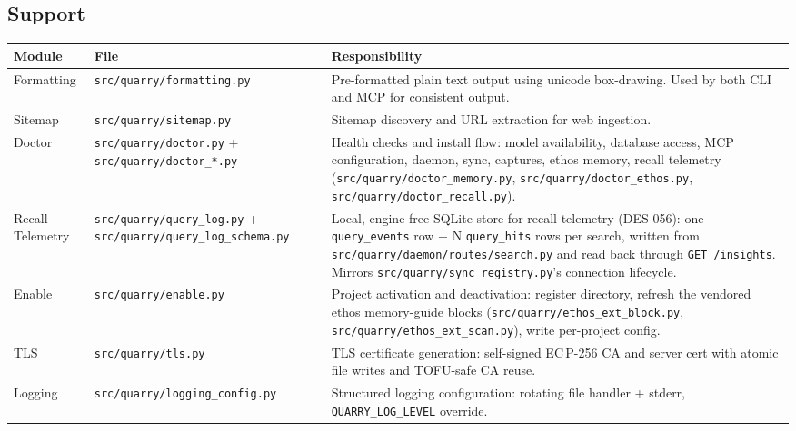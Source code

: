 \documentclass[a4paper,10pt]{article}
\newcommand{\modpath}[1]{\texttt{src/quarry/#1}}
\begin{document}
\subsection{Support}

\begin{center}
\begin{tabular}{llp{7cm}}
\toprule
\textbf{Module} & \textbf{File} & \textbf{Responsibility} \\
\midrule
Formatting & \modpath{formatting.py} & Pre-formatted plain text
             output using unicode box-drawing.  Used by both CLI
             and MCP for consistent output. \\
Sitemap    & \modpath{sitemap.py}    & Sitemap discovery and URL
             extraction for web ingestion. \\
Doctor     & \modpath{doctor.py} + \modpath{doctor\_*.py} & Health checks
             and install flow: model availability, database access, MCP
             configuration, daemon, sync, captures, ethos memory, recall
             telemetry (\modpath{doctor\_memory.py}, \modpath{doctor\_ethos.py},
             \modpath{doctor\_recall.py}). \\
Recall Telemetry & \modpath{query\_log.py} + \modpath{query\_log\_schema.py}
             & Local, engine-free SQLite store for recall telemetry
             (DES-056): one \texttt{query\_events} row + N
             \texttt{query\_hits} rows per search, written from
             \modpath{daemon/routes/search.py} and read back through
             \texttt{GET /insights}. Mirrors \modpath{sync\_registry.py}'s
             connection lifecycle. \\
Enable     & \modpath{enable.py}     & Project activation and
             deactivation: register directory, refresh the vendored
             ethos memory-guide blocks (\modpath{ethos\_ext\_block.py},
             \modpath{ethos\_ext\_scan.py}), write per-project config. \\
TLS        & \modpath{tls.py}        & TLS certificate generation:
             self-signed EC\,P-256 CA and server cert with
             atomic file writes and TOFU-safe CA reuse. \\
Logging    & \modpath{logging\_config.py} & Structured logging
             configuration: rotating file handler + stderr,
             \texttt{QUARRY\_LOG\_LEVEL} override. \\
\bottomrule
\end{tabular}
\end{center}
\end{document}
